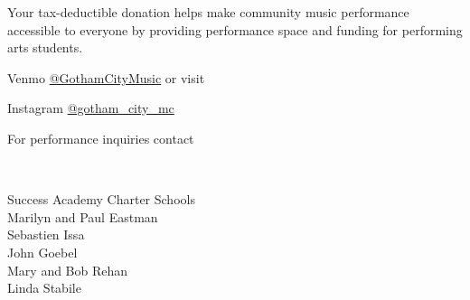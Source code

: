 \documentclass{article}[10pt]
\begin{document}
\begin{center}
\begin{minipage}{4in}
            \begin{center}
            {\textbf{}}
            \end{center}

            \vspace{-0.1in}

            \begin{small}
                Your tax-deductible donation helps make community music performance accessible to everyone by providing performance space and funding for performing arts students.\\
            \end{small}


            Venmo \href{https://account.venmo.com/u/GothamCityMusic}{@GothamCityMusic} or visit \textbf{}

            \begin{center}
            {\textbf{}}

                \faInstagram{}{}  Instagram  \href{https://www.instagram.com/gotham_city_mc/}{@gotham\_city\_mc}


                For performance inquiries contact
                    {\textbf{}}
            \end{center}

            \begin{center}
            {\textbf{}}\\

                \begin{small}
                    \vspace{-0.11in}
                    \begin{multicols*}{2}
                    {Success Academy Charter Schools}\\
                        Marilyn and Paul Eastman\\
                        Sebastien Issa\\
                        John Goebel\\
                        Mary and Bob Rehan\\
                        Linda Stabile
                    \end{multicols*}
                \end{small}
            \end{center}

        \end{minipage}

    \end{center}
\end{document}
